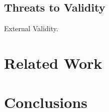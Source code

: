 \documentclass[sigconf,anonymous]{acmart}
\begin{document}
\subsection{Threats to Validity}

External Validity. 

\section{Related Work}


\section{Conclusions}






\end{document}
